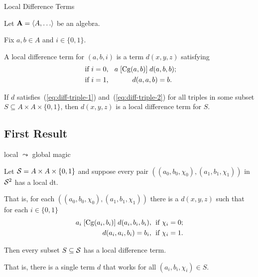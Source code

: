 \documentclass[notes=hide,12pt,xcolor=dvipsnames%
   ]{beamer}
\renewcommand{\defn}[1]{\alert{#1}}
\newcommand{\bigpause}{\pause\bigskip}
\newcommand{\medpause}{\pause\medskip}
\theoremstyle{definition}
\begin{document}
\begin{frame}[label=local-diff-term-defs,shrink]{Local Difference Terms}

  Let $\bA=\< A, \dots\>$ be an algebra.

  Fix $a, b \in A$ and $i \in \{0,1\}$.

  A \defn{local difference term for $(a,b,i)$} is a term $d(x,y,z)$ satisfying
  \begin{align}
    \text{ if $i=0$, } \; & \; a \mathrel{[\operatorname{Cg}(a,b)]} d(a,b,b); \label{eq:diff-triple-1}\\
    \text{ if $i=1$, } \; & \hskip1cm d(a,a,b) = b. \label{eq:diff-triple-2}
  \end{align}

  \bigpause
  If $d$ satisfies~(\ref{eq:diff-triple-1}) and~(\ref{eq:diff-triple-2}) for all triples
  in some subset $S\subseteq A \times A \times \{0,1\}$, then $d(x,y,z)$ is a
  \defn{local difference term for $S$}.
\end{frame}


\subsection{First Result}

\begin{frame}[label=local-diff-term-res]{local $\leadsto$ global magic}%

  Let 
  $\mathcal{S} = A \times A \times \{0,1\}$ and
  suppose every pair
  $((a_0, b_0, \chi_0), (a_1, b_1, \chi_1))$
  in $\mathcal{S}^2$ has a local dt.

  \medskip

  That is, for each $((a_0, b_0, \chi_0), (a_1, b_1, \chi_1))$
  there is a $d(x,y,z)$ such that for each $i \in \{0,1\}$
  \begin{align}
    a_i \Comr{\Cg(a_i,b_i)} d(a_i,b_i,b_i), & \;
  \text{ if $\chi_i=0$;}  \label{eq:d-trip-i1}\\
  d(a_i,a_i,b_i) =b_i, & \;
  \text{ if $\chi_i=1$.}\label{eq:d-trip-i2} %
  \end{align}
  
  \medpause
  Then every subset $S\subseteq \mathcal{S}$ has a local difference term.

  \vskip1mm
  That is, there is a single term $d$ that works 
  for all $(a_i, b_i, \chi_i) \in S$.
\end{frame}
\end{document}
